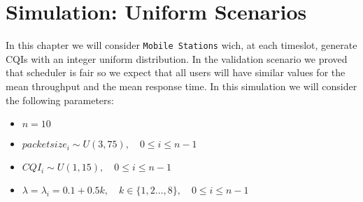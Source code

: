 \chapter{Simulation: Uniform Scenarios}
In this chapter we will consider \texttt{Mobile Stations} wich, at each timeslot, generate CQIs with an integer uniform distribution. In the validation scenario we proved that scheduler is fair so we expect that all users will have similar values for the mean throughput and the mean response time. In this simulation we will consider the following parameters:
\begin{itemize}
	\item \(n=10\)
	\item \(packetsize_{i} \sim U(3,75), \quad 0 \le i \le n-1\)
	\item \(CQI_{i} \sim U(1,15), \quad 0 \le i \le n-1\)
	\item \( \lambda = \lambda_{i} = 0.1 + 0.5k, \quad k\in\{1,2\ldots,8\}, \quad 0 \le i \le n-1\)
\end{itemize}
